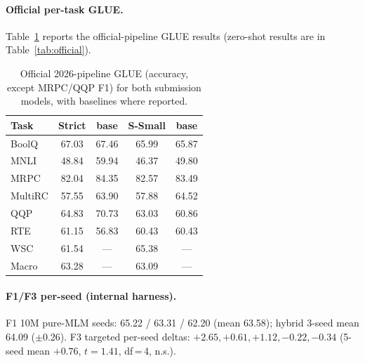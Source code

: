 \documentclass[11pt]{article}
\begin{document}
\paragraph{Official per-task GLUE.} Table~\ref{tab:official_glue} reports the official-pipeline GLUE results (zero-shot results are in Table~\ref{tab:official}).

\begin{table}[h]
\centering\small
\caption{Official 2026-pipeline GLUE (accuracy, except MRPC/QQP F1) for both submission models, with baselines where reported.}
\label{tab:official_glue}
\begin{tabular}{lcccc}
\toprule
Task & Strict & base & S-Small & base \\
\midrule
BoolQ & 67.03 & 67.46 & 65.99 & 65.87 \\
MNLI & 48.84 & 59.94 & 46.37 & 49.80 \\
MRPC & 82.04 & 84.35 & 82.57 & 83.49 \\
MultiRC & 57.55 & 63.90 & 57.88 & 64.52 \\
QQP & 64.83 & 70.73 & 63.03 & 60.86 \\
RTE & 61.15 & 56.83 & 60.43 & 60.43 \\
WSC & 61.54 & --- & 65.38 & --- \\
\midrule
Macro & 63.28 & --- & 63.09 & --- \\
\bottomrule
\end{tabular}
\end{table}

\paragraph{F1/F3 per-seed (internal harness).} F1 10M pure-MLM seeds: 65.22 / 63.31 / 62.20 (mean 63.58); hybrid 3-seed mean 64.09 ($\pm$0.26). F3 targeted per-seed deltas: $+2.65, +0.61, +1.12, -0.22, -0.34$ (5-seed mean $+0.76$, $t=1.41$, df\,=\,4, n.s.).
\end{document}
